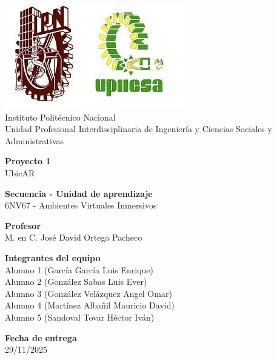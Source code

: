 
\begin{titlepage}

    \centering %

    \includegraphics[scale=0.4]{imagenes/upiicsa-ipn} %
    \\ Instituto Politécnico Nacional
    \\ Unidad Profesional Interdisciplinaria de Ingeniería y Ciencias Sociales y Administrativas
    
    \vspace{1cm} %

    \textbf{Proyecto 1}
    \\ UbicAR

    \vspace{1cm} %

    \textbf{Secuencia - Unidad de aprendizaje}
    \\ 6NV67 - Ambientes Virtuales Inmersivos

    \vspace{1cm} %

    \textbf{Profesor}
	\\M. en C. José David Ortega Pacheco


    \vspace{1cm} %

	\textbf{Integrantes del equipo}\\
    Alumno 1 (García García Luis Enrique) \\
    Alumno 2 (González Sabas Luis Ever)\\
    Alumno 3 (González Velázquez Angel Omar) \\
    Alumno 4 (Martínez Albañil Mauricio David)\\
    Alumno 5 (Sandoval Tovar Héctor Iván)  

    \vspace{1cm} %

	\textbf{Fecha de entrega}\\
	29/11/2025

\end{titlepage}